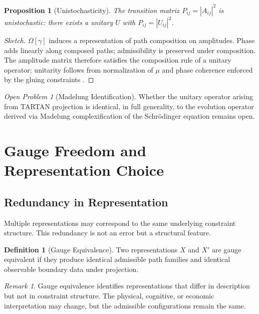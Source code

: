 \documentclass[11pt]{article}
\theoremstyle{plain}
\newtheorem{proposition}[theorem]{Proposition}
\theoremstyle{definition}
\newtheorem{definition}[theorem]{Definition}
\theoremstyle{remark}
\newtheorem{remark}[theorem]{Remark}
\newtheorem{openproblem}[theorem]{Open Problem}
\begin{document}
\begin{proposition}[Unistochasticity]
The transition matrix $P_{ij} = |A_{ij}|^2$ is unistochastic: there exists
a unitary $U$ with $P_{ij} = |U_{ij}|^2$.
\end{proposition}

\begin{proof}[Sketch]
$\Omega[\gamma]$ induces a representation of path composition on amplitudes.
Phase adds linearly along composed paths; admissibility is preserved under
composition. The amplitude matrix therefore satisfies the composition rule
of a unitary operator; unitarity follows from normalization of $\mu$ and
phase coherence enforced by the gluing constraints
\cite{barandes2023unistochastic}.
\end{proof}

\begin{openproblem}[Madelung Identification]
Whether the unitary operator arising from TARTAN projection is identical,
in full generality, to the evolution operator derived via Madelung
complexification of the Schr\"{o}dinger equation remains open.
\end{openproblem}

\section{Gauge Freedom and Representation Choice}

\subsection{Redundancy in Representation}

Multiple representations may correspond to the same underlying
constraint structure. This redundancy is not an error but a structural
feature.

\begin{definition}[Gauge Equivalence]
Two representations $X$ and $X'$ are gauge equivalent if they produce
identical admissible path families and identical observable boundary
data under projection.
\end{definition}

\begin{remark}
Gauge equivalence identifies representations that differ in description
but not in constraint structure. The physical, cognitive, or economic
interpretation may change, but the admissible configurations remain the same.
\end{remark}
\end{document}

